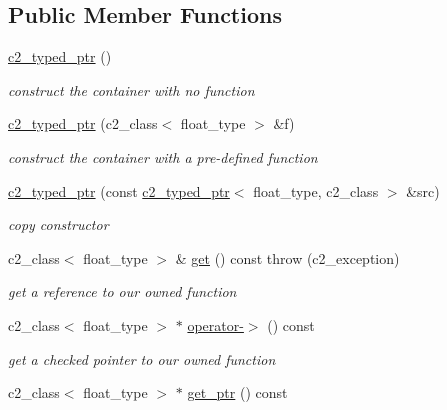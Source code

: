 \subsection*{Public Member Functions}
\begin{DoxyCompactItemize}
\item 
\hypertarget{classc2__typed__ptr_aa50075cc2555fd6a2464a5b775ac19b0}{\hyperlink{classc2__typed__ptr_aa50075cc2555fd6a2464a5b775ac19b0}{c2\-\_\-typed\-\_\-ptr} ()}\label{classc2__typed__ptr_aa50075cc2555fd6a2464a5b775ac19b0}

\begin{DoxyCompactList}\small\item\em construct the container with no function \end{DoxyCompactList}\item 
\hyperlink{classc2__typed__ptr_ad18d12500a51383b8cb37462b8db7c8b}{c2\-\_\-typed\-\_\-ptr} (c2\-\_\-class$<$ float\-\_\-type $>$ \&f)
\begin{DoxyCompactList}\small\item\em construct the container with a pre-\/defined function \end{DoxyCompactList}\item 
\hyperlink{classc2__typed__ptr_a7f777e2f429fa05e0ff3e8f821826857}{c2\-\_\-typed\-\_\-ptr} (const \hyperlink{classc2__typed__ptr}{c2\-\_\-typed\-\_\-ptr}$<$ float\-\_\-type, c2\-\_\-class $>$ \&src)
\begin{DoxyCompactList}\small\item\em copy constructor \end{DoxyCompactList}\item 
\hypertarget{classc2__typed__ptr_a5b17f0c0b7f74e51e5e588a44089d8b2}{c2\-\_\-class$<$ float\-\_\-type $>$ \& \hyperlink{classc2__typed__ptr_a5b17f0c0b7f74e51e5e588a44089d8b2}{get} () const   throw (c2\-\_\-exception)}\label{classc2__typed__ptr_a5b17f0c0b7f74e51e5e588a44089d8b2}

\begin{DoxyCompactList}\small\item\em get a reference to our owned function \end{DoxyCompactList}\item 
\hypertarget{classc2__typed__ptr_aac8d0a87b319dba4a2758e313500162a}{c2\-\_\-class$<$ float\-\_\-type $>$ $\ast$ \hyperlink{classc2__typed__ptr_aac8d0a87b319dba4a2758e313500162a}{operator-\/$>$} () const }\label{classc2__typed__ptr_aac8d0a87b319dba4a2758e313500162a}

\begin{DoxyCompactList}\small\item\em get a checked pointer to our owned function \end{DoxyCompactList}\item 
\hypertarget{classc2__typed__ptr_a223f362849efffc57b42d576019bac01}{c2\-\_\-class$<$ float\-\_\-type $>$ $\ast$ \hyperlink{classc2__typed__ptr_a223f362849efffc57b42d576019bac01}{get\-\_\-ptr} () const }\label{classc2__typed__ptr_a223f362849efffc57b42d576019bac01}


\end{DoxyCompactItemize}
